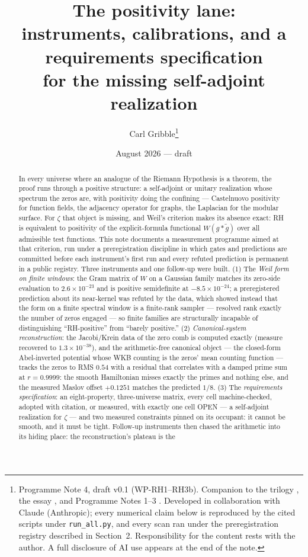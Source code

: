 \documentclass[11pt]{article}
\title{The positivity lane:\\ instruments, calibrations, and a requirements
specification\\ for the missing self-adjoint realization}
\author{Carl Gribble\thanks{Programme Note 4, draft v0.1 (WP-RH1--RH3b). Companion to the trilogy
\cite{CompanionI,CompanionII,CompanionIII}, the essay \cite{Essay}, and Programme Notes 1--3
\cite{Defs,FormalLog,Observer}. Developed in collaboration with Claude (Anthropic); every numerical
claim below is reproduced by the cited scripts under \texttt{run\_all.py}, and every scan ran under
the preregistration registry described in Section~2. Responsibility for the content rests with the
author. A full disclosure of AI use appears at the end of the note.}}
\date{August 2026 --- draft}
\theoremstyle{remark}
\begin{document}
\maketitle

\begin{abstract}
In every universe where an analogue of the Riemann Hypothesis is a theorem, the proof runs through a
positive structure: a self-adjoint or unitary realization whose spectrum the zeros are, with
positivity doing the confining --- Castelnuovo positivity for function fields, the adjacency operator
for graphs, the Laplacian for the modular surface. For $\zeta$ that object is missing, and Weil's
criterion makes its absence exact: RH is equivalent to positivity of the explicit-formula functional
$W(g * \tilde g)$ over all admissible test functions. This note documents a measurement programme
aimed at that criterion, run under a preregistration discipline in which gates and predictions are
committed before each instrument's first run and every refuted prediction is permanent in a public
registry. Three instruments and one follow-up were built. (1) The \emph{Weil form on finite windows}:
the Gram matrix of $W$ on a Gaussian family matches its zero-side evaluation to $2.6\times10^{-23}$
and is positive semidefinite at $-8.5\times10^{-24}$; a preregistered prediction about its
near-kernel was refuted by the data, which showed instead that the form on a finite spectral window
is a finite-rank sampler --- resolved rank exactly the number of zeros engaged --- so finite families
are structurally incapable of distinguishing ``RH-positive'' from ``barely positive.''
(2) \emph{Canonical-system reconstruction}: the Jacobi/Krein data of the zero comb is computed
exactly (measure recovered to $1.3\times10^{-38}$), and the arithmetic-free canonical object --- the
closed-form Abel-inverted potential whose WKB counting is the zeros' mean counting function ---
tracks the zeros to RMS $0.54$ with a residual that correlates with a damped prime sum at
$r = 0.9999$: the smooth Hamiltonian misses exactly the primes and nothing else, and the measured
Maslov offset $+0.1251$ matches the predicted $1/8$. (3) The \emph{requirements specification}: an
eight-property, three-universe matrix, every cell machine-checked, adopted with citation, or
measured, with exactly one cell OPEN --- a self-adjoint realization for $\zeta$ --- and two measured
constraints pinned on its occupant: it cannot be smooth, and it must be tight. Follow-up
instruments then chased the arithmetic into its hiding place: the reconstruction's plateau is the

\end{abstract}
\end{document}

